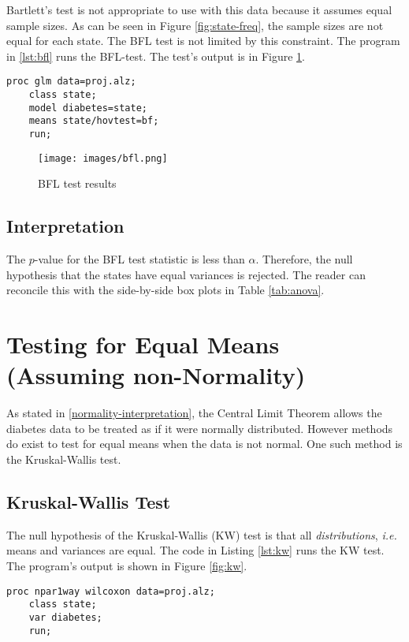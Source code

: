 \documentclass{article}
\begin{document}
Bartlett's test is not appropriate to use with this data because it assumes equal sample sizes. As can be seen in Figure \ref{fig:state-freq}, the sample sizes are not equal for each state. The BFL test is not limited by this constraint. The program in \ref{lst:bfl} runs the BFL-test. The test's output is in Figure \ref{fig:bfl}. 

\begin{lstlisting}[language=SAS,caption=BFL test SAS progam,captionpos=b,label=lst:bfl]
    proc glm data=proj.alz;
    class state;
    model diabetes=state;
    means state/hovtest=bf;
    run;
\end{lstlisting}

\begin{figure}[ht]
    \centering
    \texttt{[image: images/bfl.png]}
    \caption{BFL test results}
    \label{fig:bfl}
\end{figure}

\subsection{Interpretation}
The $p$-value for the BFL test statistic is less than $\alpha$. Therefore, the null hypothesis that the states have equal variances is rejected. The reader can reconcile this with the side-by-side box plots in Table \ref{tab:anova}.

\section{Testing for Equal Means (Assuming non-Normality)}
As stated in \ref{normality-interpretation}, the Central Limit Theorem allows the diabetes data to be treated as if it were normally distributed. However methods do exist to test for equal means when the data is not normal. One such method is the Kruskal-Wallis test.

\subsection{Kruskal-Wallis Test}
The null hypothesis of the Kruskal-Wallis (KW) test is that all \textit{distributions}, \textit{i.e.} means and variances are equal. The code in Listing \ref{lst:kw} runs the KW test. The program's output is shown in Figure \ref{fig:kw}.

\begin{lstlisting}[language=SAS,caption=Kruskal-Wallis test SAS progam,captionpos=b,label=lst:kw]
    proc npar1way wilcoxon data=proj.alz;
    class state;
    var diabetes;
    run;
\end{lstlisting}
\end{document}
